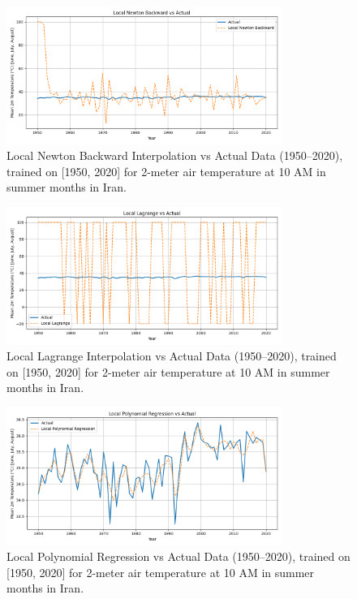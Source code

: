 \begin{figure}[htbp]
    \centering
    \includegraphics[width=0.8\textwidth]{../figs/Local_Newton_Backward_vs_actual[1950, 2020, 1].png}
    \caption{Local Newton Backward Interpolation vs Actual Data (1950--2020), trained on [1950, 2020] for 2-meter air temperature at 10 AM in summer months in Iran.}
    \label{fig:backward}
\end{figure}

\begin{figure}[htbp]
    \centering
    \includegraphics[width=0.8\textwidth]{../figs/Local_Lagrange_vs_actual[1950, 2020, 1].png}
    \caption{Local Lagrange Interpolation vs Actual Data (1950--2020), trained on [1950, 2020] for 2-meter air temperature at 10 AM in summer months in Iran.}
    \label{fig:lagrange}
\end{figure}

\begin{figure}[htbp]
    \centering
    \includegraphics[width=0.8\textwidth]{../figs/Local_Polynomial_Regression_vs_actual[1950, 2020, 1].png}
    \caption{Local Polynomial Regression vs Actual Data (1950--2020), trained on [1950, 2020] for 2-meter air temperature at 10 AM in summer months in Iran.}
    \label{fig:regression}
\end{figure}

